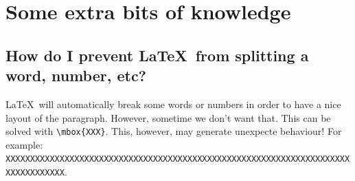 \section{Some extra bits of knowledge}

\subsection{How do I prevent \LaTeX\ from splitting a word, number, etc?}

\LaTeX\ will automatically break some words or numbers in order to have a nice layout of the paragraph. However, sometime we don't want that. This can be solved with \verb|\mbox{XXX}|. This, however, may generate unexpecte behaviour! For example: \mbox{\texttt{XXXXXXXXXXXXXXXXXXXXXXXXXXXXXXXXXXXXXXXXXXXXXXXXXXXXXXXXXXXXXXXXXXXXXXXXXXXXXXXXXX}}.


